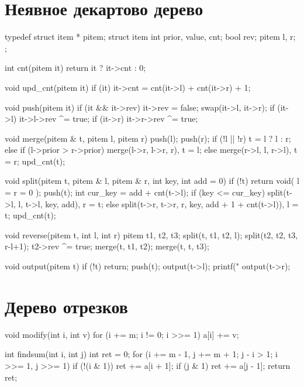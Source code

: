 \documentclass[12pt, titlepage]{article}
\begin{document}
\section{Неявное декартово дерево}
\begin{cppcode}
typedef struct item * pitem;
struct item {
    int prior, value, cnt;
    bool rev;
    pitem l, r;
};

int cnt(pitem it) {
    return it ? it->cnt : 0;
}

void upd_cnt(pitem it) {
    if (it)
        it->cnt = cnt(it->l) + cnt(it->r) + 1;
}

void push(pitem it) {
    if (it && it->rev) {
        it->rev = false;
        swap(it->l, it->r);
        if (it->l)  it->l->rev ^= true;
        if (it->r)  it->r->rev ^= true;
    }
}

void merge(pitem & t, pitem l, pitem r) {
    push(l);
    push(r);
    if (!l || !r)
        t = l ? l : r;
    else if (l->prior > r->prior)
        merge(l->r, l->r, r),  t = l;
    else
        merge(r->l, l, r->l),  t = r;
    upd_cnt(t);
}

void split(pitem t, pitem & l, pitem & r, int key, int add = 0) {
    if (!t)
        return void( l = r = 0 );
    push(t);
    int cur_key = add + cnt(t->l);
    if (key <= cur_key)
        split(t->l, l, t->l, key, add),  r = t;
    else
        split(t->r, t->r, r, key, add + 1 + cnt(t->l)),  l = t;
    upd_cnt(t);
}

void reverse(pitem t, int l, int r) {
    pitem t1, t2, t3;
    split(t, t1, t2, l);
    split(t2, t2, t3, r-l+1);
    t2->rev ^= true;
    merge(t, t1, t2);
    merge(t, t, t3);
}

void output(pitem t) {
    if (!t)  return;
    push(t);
    output(t->l);
    printf("%
    output(t->r);
}
\end{cppcode}

\section{Дерево отрезков}
\begin{cppcode}
void modify(int i, int v)
{
    for (i += m; i != 0; i >>= 1)
        a[i] += v;
}

int findsum(int i, int j)
{
    int ret = 0;
    for (i += m - 1, j += m + 1; j - i > 1; i >>= 1, j >>= 1)
    {
        if (!(i & 1))
            ret += a[i + 1];
        if (j & 1)
            ret += a[j - 1];
    }
    return ret;
}
\end{cppcode}
\end{document}
